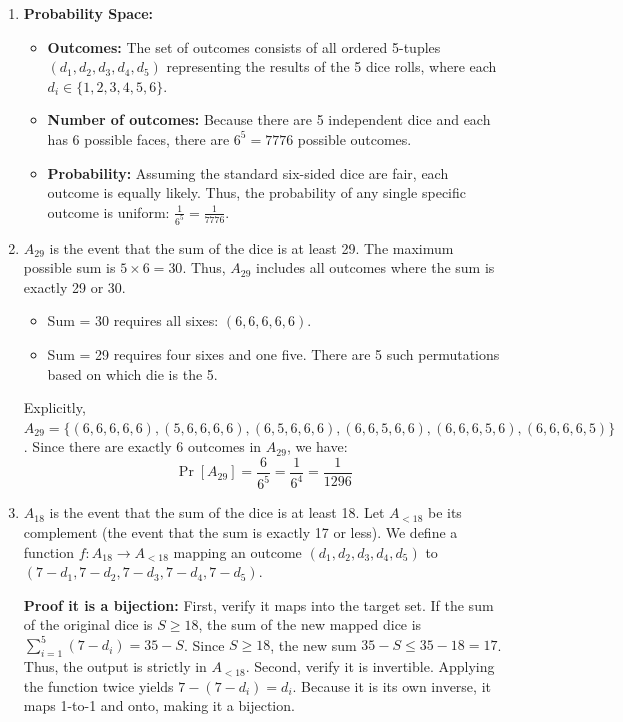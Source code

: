 \documentclass[11pt]{article}
\begin{document}
\begin{enumerate}[label=\textbf{(\alph*)}]
    \item \textbf{Probability Space:}
    \begin{itemize}
        \item \textbf{Outcomes:} The set of outcomes consists of all ordered 5-tuples $(d_1, d_2, d_3, d_4, d_5)$ representing the results of the 5 dice rolls, where each $d_i \in \{1, 2, 3, 4, 5, 6\}$.
        \item \textbf{Number of outcomes:} Because there are 5 independent dice and each has 6 possible faces, there are $6^5 = 7776$ possible outcomes.
        \item \textbf{Probability:} Assuming the standard six-sided dice are fair, each outcome is equally likely. Thus, the probability of any single specific outcome is uniform: $\frac{1}{6^5} = \frac{1}{7776}$.
    \end{itemize}

    \item $A_{29}$ is the event that the sum of the dice is at least 29. The maximum possible sum is $5 \times 6 = 30$. Thus, $A_{29}$ includes all outcomes where the sum is exactly 29 or 30.
    \begin{itemize}
        \item Sum = 30 requires all sixes: $(6, 6, 6, 6, 6)$.
        \item Sum = 29 requires four sixes and one five. There are 5 such permutations based on which die is the 5.
    \end{itemize}
    Explicitly, $A_{29} = \{(6,6,6,6,6), (5,6,6,6,6), (6,5,6,6,6), (6,6,5,6,6), (6,6,6,5,6), (6,6,6,6,5)\}$.
    Since there are exactly 6 outcomes in $A_{29}$, we have:
    $$ \Pr[A_{29}] = \frac{6}{6^5} = \frac{1}{6^4} = \frac{1}{1296} $$

    \item $A_{18}$ is the event that the sum of the dice is at least 18. 
    Let $A_{<18}$ be its complement (the event that the sum is exactly 17 or less).
    We define a function $f: A_{18} \to A_{<18}$ mapping an outcome $(d_1, d_2, d_3, d_4, d_5)$ to $(7-d_1, 7-d_2, 7-d_3, 7-d_4, 7-d_5)$. 
    
    \textbf{Proof it is a bijection:} 
    First, verify it maps into the target set. If the sum of the original dice is $S \ge 18$, the sum of the new mapped dice is $\sum_{i=1}^5 (7 - d_i) = 35 - S$. Since $S \ge 18$, the new sum $35 - S \le 35 - 18 = 17$. Thus, the output is strictly in $A_{<18}$. 
    Second, verify it is invertible. Applying the function twice yields $7 - (7 - d_i) = d_i$. Because it is its own inverse, it maps 1-to-1 and onto, making it a bijection.


\end{enumerate}
\end{document}
